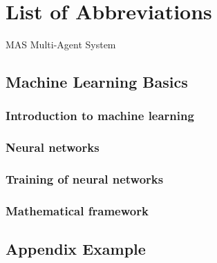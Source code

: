 \documentclass[12pt, a4paper]{report}
\begin{document}
	\chapter*{List of Abbreviations}
	\begin{abbreviations}
		\item[MAS] Multi-Agent System
	\end{abbreviations}
	
	\section{Machine Learning Basics}
	
	\subsection{Introduction to machine learning}
	
	\subsection{Neural networks}
	
	\subsection{Training of neural networks}
	
	\subsection{Mathematical framework}
	
	
	\printbibliography
	
	\begin{appendices}
		\chapter{Appendix Example}
	\end{appendices}
	
\end{document}
